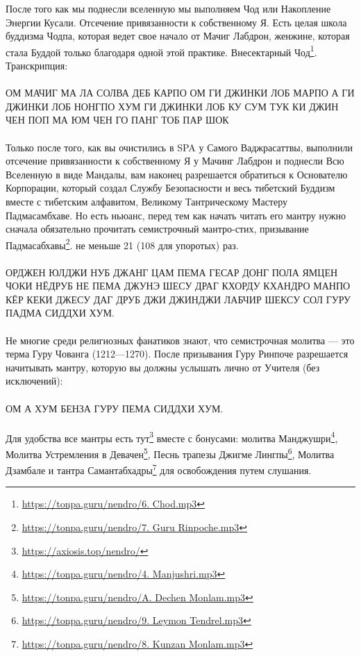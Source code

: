 После того как мы поднесли вселенную мы выполняем
Чод или Накопление Энергии Кусали. Отсечение
привязанности к собственному Я. Есть целая школа
буддизма Чодпа, которая ведет свое начало от Мачиг Лабдрон,
женжине, которая стала Буддой только благодаря одной
этой практике. Внесектарный
Чод\footnote{\url{https://tonpa.guru/nendro/6. Chod.mp3}}.
Транскрипция:
\\
\\
ОМ МАЧИГ МА ЛА СОЛВА ДЕБ КАРПО ОМ ГИ ДЖИНКИ ЛОБ
МАРПО А ГИ ДЖИНКИ ЛОБ НОНГПО ХУМ ГИ ДЖИНКИ ЛОБ
КУ СУМ ТУК КИ ДЖИН ЧЕН ПОП МА ЮМ ЧЕН ГО ПАНГ ТОБ ПАР ШОК
\\
\\
Только после того, как вы очистились в SPA у Самого Ваджрасаттвы,
выполнили отсечение привязанности к собственному Я у Мачинг Лабдрон
и поднесли Всю Вселенную в виде Мандалы, вам наконец разрешается
обратиться к Основателю Корпорации, который создал Службу
Безопасности и весь тибетский Буддизм вместе с тибетским
алфавитом, Великому Тантрическому Мастеру Падмасамбхаве.
Но есть ньюанс, перед тем как начать читать его мантру
нужно сначала обязательно прочитать семистрочный мантро-стих,
призывание Падмасабхавы\footnote{\url{https://tonpa.guru/nendro/7. Guru Rinpoche.mp3}}.
не меньше 21 (108 для упоротых) раз.
\\
\\
ОРДЖЕН ЮЛДЖИ НУБ ДЖАНГ ЦАМ ПЕМА ГЕСАР ДОНГ ПОЛА
ЯМЦЕН ЧОКИ НЁДРУБ НЕ ПЕМА ДЖУНЭ ШЕСУ ДРАГ КХОРДУ
КХАНДРО МАНПО КЁР КЕКИ ДЖЕСУ ДАГ ДРУБ ДЖИ ДЖИНДЖИ
ЛАБЧИР ШЕКСУ СОЛ ГУРУ ПАДМА СИДДХИ ХУМ.
\\
\\
Не многие среди религиозных фанатиков знают, что семистрочная
молитва — это терма Гуру Чованга (1212—1270). После призывания
Гуру Ринпоче разрешается начитывать мантру, которую вы должны
услышать лично от Учителя (без исключений):
\\
\\
ОМ А ХУМ БЕНЗА ГУРУ ПЕМА СИДДХИ ХУМ.
\\
\\
Для удобства все мантры есть тут\footnote{\url{https://axiosis.top/nendro/}}
вместе с бонусами: молитва Манджушри\footnote{\url{https://tonpa.guru/nendro/4. Manjushri.mp3}},
Молитва Устремления в Девачен\footnote{\url{https://tonpa.guru/nendro/A. Dechen Monlam.mp3}},
Песнь трапезы Джигме Лингпы\footnote{\url{https://tonpa.guru/nendro/9. Leymon Tendrel.mp3}},
Молитва Дзамбале и тантра Самантабхадры\footnote{\url{https://tonpa.guru/nendro/8. Kunzan Monlam.mp3}} для
освобождения путем слушания.

